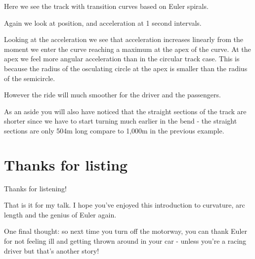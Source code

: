 \documentclass[]{article} %
\theoremstyle{definition}
\theoremstyle{theorem}
\begin{document}
Here we see the track with transition curves based on Euler spirals. 

Again we look at position, and acceleration at 1 second intervals. 

Looking at the acceleration we see that acceleration increases linearly from the moment we enter the curve reaching a maximum at the apex of the curve. At the apex we feel more angular acceleration than in the circular track case. This is because the radius of the osculating circle at the apex is smaller than the radius of the semicircle.

However the ride will much smoother for the driver and the passengers.

As an aside you will also have noticed that the straight sections of the track are shorter since we have to start turning much earlier in the bend - the straight sections are only 504m long compare to 1,000m in the previous example.

\section{Thanks for listing}
\begin{tcolorbox}
	\centering
	Thanks for listening!
\end{tcolorbox}

That is it for my talk. I hope you've enjoyed this introduction to curvature, arc length and the genius of Euler again.

One final thought: so next time you turn off the motorway, you can thank Euler for not feeling ill and getting thrown around in your car - unless you're a racing driver but that's another story!
\end{document}
